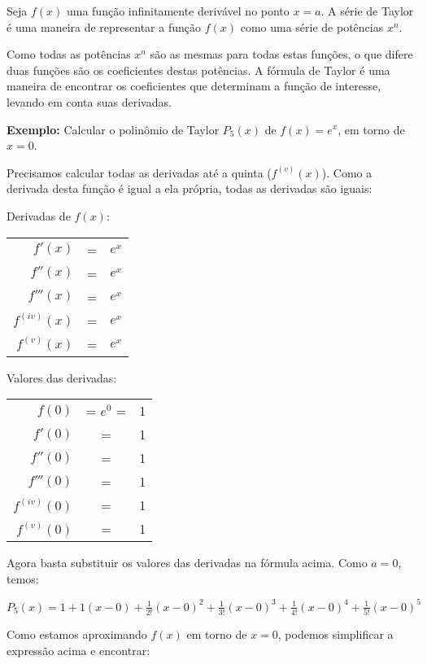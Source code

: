 \documentclass[a4paper]{article}
\begin{document}
Seja $f(x)$ uma função infinitamente derivável no ponto $x=a$.
A série de Taylor é uma maneira de representar a função $f(x)$ como uma série de potências $x^n$.

Como todas as potências $x^n$ são as mesmas para todas estas funções, o que difere duas funções são os coeficientes destas potências.
A fórmula de Taylor é uma maneira de encontrar os coeficientes que determinam a função de interesse, levando em conta suas derivadas.

{\bf Exemplo:} Calcular o polinômio de Taylor $P_5(x)$ de $f(x)=e^x$, em torno de $x=0$.

Precisamos calcular todas as derivadas até a quinta ($f^{(v)}(x)$).
Como a derivada desta função é igual a ela própria, todas as derivadas são iguais:

\begin{multicols}{2}

Derivadas de $f(x)$:

  \begin{tabular}{rcl}
    $f'(x)$ &=& $e^x$\\
    $f''(x)$ &=& $e^x$\\
    $f'''(x)$ &=& $e^x$\\
    $f^{(iv)}(x)$ &=& $e^x$\\
    $f^{(v)}(x)$ &=& $e^x$\\
  \end{tabular}

  \columnbreak

Valores das derivadas:

  \begin{tabular}{rcl}
    $f(0)$ &= $e^0$ =& 1\\
    $f'(0)$ &=& 1\\
    $f''(0)$ &=& 1\\
    $f'''(0)$ &=& 1\\
    $f^{(iv)}(0)$ &=& 1\\
    $f^{(v)}(0)$ &=& 1\\
  \end{tabular}
\end{multicols}

Agora basta substituir os valores das derivadas na fórmula acima.
Como $a=0$, temos:

$P_5(x) = 1+ 1(x-0) + \frac{1}{2!}(x-0)^2 + \frac{1}{3!}(x-0)^3 + \frac{1}{4!}(x-0)^4 + \frac{1}{5!}(x-0)^5$

Como estamos aproximando $f(x)$ em torno de $x=0$, podemos simplificar a expressão acima e encontrar:
\end{document}
